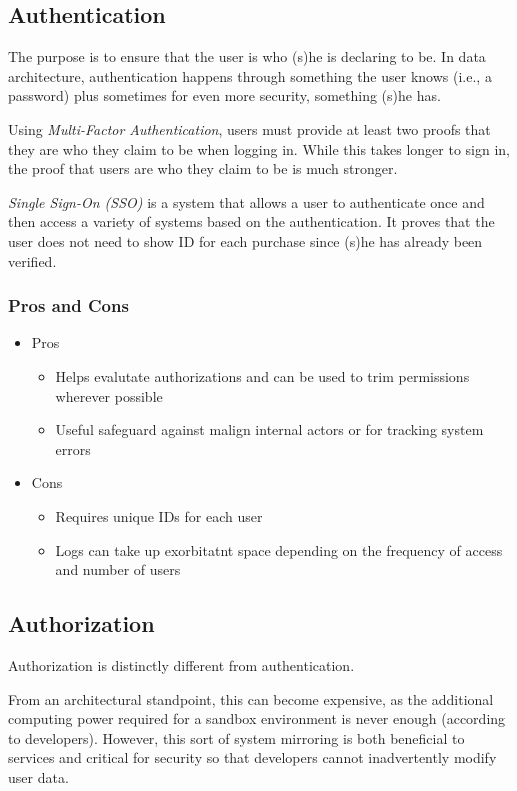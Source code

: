 \documentclass[12pt,a4paper]{article}
\begin{document}
\subsection{Authentication}

The purpose is to ensure that the user is who (s)he is declaring to be. In data architecture, authentication happens through something the user knows (i.e., a password) plus sometimes for even more security, something (s)he has.

Using \textit{Multi-Factor Authentication}, users must provide at least two proofs that they are who they claim to be when logging in. While this takes longer to sign in, the proof that users are who they claim to be is much stronger.

\textit{Single Sign-On (SSO)} is a system that allows a user to authenticate once and then access a variety of systems based on the authentication. It proves that the user does not need to show ID for each
purchase since (s)he has already been verified.

\subsubsection{Pros and Cons}

\begin{itemize}
	\item Pros
		\begin{itemize}
			\item Helps evalutate authorizations and can be used to trim permissions wherever possible
			\item Useful safeguard against malign internal actors or for tracking system errors
		\end{itemize}
	\item Cons 
		\begin{itemize}
			\item Requires unique IDs for each user
			\item Logs can take up exorbitatnt space depending on the frequency of access and number of users
		\end{itemize}
\end{itemize}

\subsection{Authorization}

Authorization is distinctly different from authentication. 

From an architectural standpoint, this can become expensive, as the additional computing power required for a sandbox environment is never enough (according to developers). However, this sort of system mirroring is both beneficial to services and critical for security so that developers cannot inadvertently modify user data.
\end{document}
